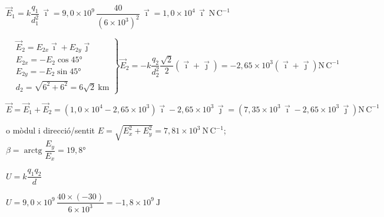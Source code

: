\begin{solapartat}
\begin{minipage}[t]{0.68\linewidth}
\vspace{0pt}
 $\vec{E}_1 = k\dfrac{q_1}{d_1^2}\,\vec{\imath} = 9,0\times 10^{9}\,\dfrac{40}{\left(6\times 10^{3}\right)^2}\,\vec{\imath} = 1,0\times 10^{4}\,\vec{\imath}\ \mathrm{N\,C^{-1}}$
\end{minipage}\hfill
\begin{minipage}[t]{0.28\linewidth}
\vspace{0pt}
\end{minipage}

\medskip
{} $\left.\begin{aligned}
&\vec{E}_2 = E_{2x}\vec{\imath} + E_{2y}\vec{\jmath}\\
&E_{2x} = -E_2\cos 45°\\
&E_{2y} = -E_2\sin 45°\\
&d_2 = \sqrt{6^2 + 6^2} = 6\sqrt{2}\ \mathrm{km}
\end{aligned}\right\}
\vec{E}_2 = -k\dfrac{q_2}{d_2^2}\dfrac{\sqrt{2}}{2}\left(\vec{\imath} + \vec{\jmath}\right) = -2,65\times 10^{3}\left(\vec{\imath} + \vec{\jmath}\right)\mathrm{N\,C^{-1}}$ 

\medskip
{}
\[ \vec{E} = \vec{E}_1 + \vec{E}_2 = \left(1,0\times 10^{4} - 2,65\times 10^{3}\right)\vec{\imath} - 2,65\times 10^{3}\,\vec{\jmath} = \left(7,35\times 10^{3}\,\vec{\imath} - 2,65\times 10^{3}\,\vec{\jmath}\right)\mathrm{N\,C^{-1}} \]

o mòdul i direcció/sentit $E = \sqrt{E_x^2 + E_y^2} = 7,81\times 10^{3}\ \mathrm{N\,C^{-1}}$; \ $\beta = \operatorname{arctg}\dfrac{E_y}{E_x} = 19,8°$
\end{solapartat}

\begin{solapartat}
 $U = k\dfrac{q_1 q_2}{d}$

\smallskip
{} $U = 9,0\times 10^{9}\,\dfrac{40\times(-30)}{6\times 10^{3}} = -1,8\times 10^{9}\ \mathrm{J}$
\end{solapartat}
